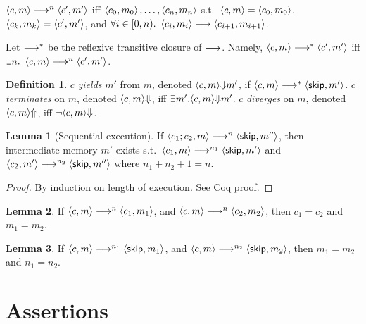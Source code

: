\documentclass[10pt]{article}
\theoremstyle{definition}
\newtheorem{definition}{Definition}
\newtheorem{lemma}{Lemma}
\begin{document}
$\Cfg(c,m) \sstepston n \Cfg(c',m')$ iff
$\Cfg(c_0,m_0),\dots,\Cfg(c_n,m_n)$
s.t.\ $\Cfg(c,m)=\Cfg(c_0,m_0)$,
$\Cfg(c_k,m_k)=\Cfg(c',m')$,
and $\forall i \in [0,n).\ \Cfg(c_i,m_i) \sstepsto \Cfg(c_{i+1},m_{i+1})$.


Let $\mathrel{\mathrel{\longrightarrow}^{\ast}}$ be the reflexive transitive closure of $\mathrel{\longrightarrow}$. Namely,
$\Cfg(c,m) \sstepstotrans \Cfg(c',m')$ iff
$\exists n.\ \Cfg(c,m) \sstepston n \Cfg(c',m')$.

\begin{definition}
    $c$ \emph{yields} $m'$ from $m$,
    denoted $\Yields(c,m,m')$,
    if $\Cfg(c,m) \sstepstotrans \Cfg(\Skip,m')$.
    $c$ \emph{terminates} on $m$, denoted $\Terminate(c,m)$,
    iff $\exists m'. \Yields(c,m,m')$.
    $c$ \emph{diverges} on $m$, denoted $\Diverge(c,m)$,
    iff $\neg \Terminate(c,m)$.
\end{definition}

\begin{lemma}[Sequential execution]
    If $\Cfg(c_1; c_2, m) \sstepston n \Cfg(\Skip, m'')$, 
    then intermediate memory $m'$ exists s.t.\
    $\Cfg(c_1, m) \sstepston{n_1} \Cfg(\Skip, m')$
    and $\Cfg(c_2, m') \sstepston{n_2} \Cfg(\Skip, m'')$
    where $n_1+n_2+1=n$.
\end{lemma}
\begin{proof}
    By induction on length of execution. See Coq proof.
\end{proof}

\begin{lemma}
    If $\Cfg(c,m) \sstepston n \Cfg(c_1,m_1)$,
    and $\Cfg(c,m) \sstepston n \Cfg(c_2,m_2)$,
    then $c_1 = c_2$ and $m_1 = m_2$.
\end{lemma}

\begin{lemma}
    If $\Cfg(c,m) \sstepston{n_1} \Cfg(\Skip,m_1)$,
    and $\Cfg(c,m) \sstepston{n_2} \Cfg(\Skip,m_2)$,
    then $m_1 = m_2$ and $n_1 = n_2$.
\end{lemma}

\section{Assertions}

\newcommand*{\domivar}{\mathsf{IVar}}

\newcommand*{\DomAssert}{\mathsf{Assrt}}
\newcommand*{\DomAexpv}{\mathsf{Aexpv}}
\end{document}
